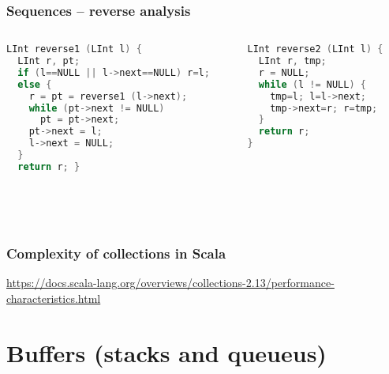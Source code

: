 \documentclass[aspectratio=169]{beamer}
\begin{document}
\begin{frame}[fragile]\frametitle{Sequences -- reverse analysis}
  
\begin{columns}
\begin{column}{.48\textwidth}
\begin{lstlisting}[language=C++, emph={reverse1,reverse2,LInt}]
LInt reverse1 (LInt l) {
  LInt r, pt;
  if (l==NULL || l->next==NULL) r=l;
  else {
    r = pt = reverse1 (l->next);
    while (pt->next != NULL)
      pt = pt->next;
    pt->next = l;
    l->next = NULL;
  }
  return r; }
\end{lstlisting}
%
\end{column}
\begin{column}{.50\textwidth}
%
\begin{lstlisting}[language=C++, emph={reverse1,reverse2,LInt}]
LInt reverse2 (LInt l) {
  LInt r, tmp;
  r = NULL;
  while (l != NULL) {
    tmp=l; l=l->next;
    tmp->next=r; r=tmp;
  }
  return r;
}
\end{lstlisting}
%
\end{column}
\end{columns}

~\\[-6mm]
~\\[-12mm]
\end{frame}


\begin{frame}\frametitle{Complexity of collections in Scala}
    
    \centering

    \begin{block}{}
    {\huge \url{https://docs.scala-lang.org/overviews/collections-2.13/performance-characteristics.html}}      
    \end{block}


\end{frame}


\section{Buffers (stacks and queueus)}
\end{document}
